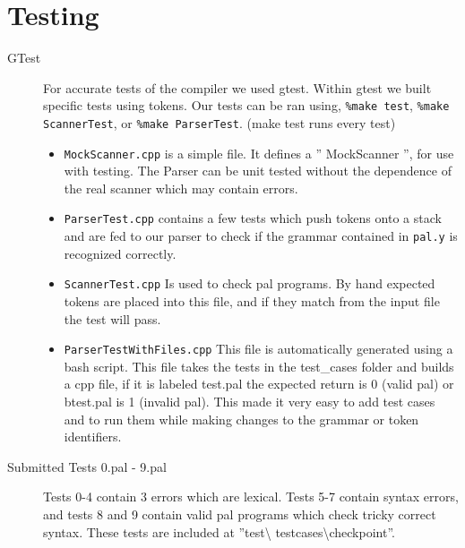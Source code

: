 \documentclass{article}
\begin{document}
\section*{Testing}
\begin{description}
	
\item[GTest]
	For accurate tests of the compiler we used gtest. Within gtest we
	built specific tests using tokens. Our tests can be ran using,
	\texttt{\%make test}, \texttt{\%make ScannerTest}, or \texttt{\%make ParserTest}.
	(make test runs every test)
	\begin{itemize}
		\item \texttt{MockScanner.cpp} is a simple file. It defines a 
		'' MockScanner '', for use with testing. The Parser can be unit tested
		without the dependence of the real scanner which may contain errors.
		\item \texttt{ParserTest.cpp} contains a few tests which push
		tokens onto a stack and are fed to our parser to check if the 
		grammar contained in  \texttt{pal.y} is recognized correctly.
		
		\item \texttt{ScannerTest.cpp} Is used to check pal programs.
		By hand expected tokens are placed into this file, and if they match
		from the input file the test will pass.
		
		\item \texttt{ParserTestWithFiles.cpp} This file is automatically
		generated using a bash script. This file takes the tests in
		the test\_cases folder and builds a cpp file, if it is labeled test\*.pal
		the expected return is 0 (valid pal) or btest\*.pal is 1 (invalid pal).
		This made it very easy to add test cases and to run them while making 
		changes to the grammar or token identifiers.
	\end{itemize}
\item[Submitted Tests 0.pal - 9.pal]
	Tests 0-4 contain 3 errors which are lexical. Tests 5-7 contain
	syntax errors, and tests 8 and 9 contain valid pal programs which 
	check tricky correct syntax. These tests are included at ''test\textbackslash 
	test\textunderscore cases\textbackslash checkpoint''.
\end{description}
\end{document}
